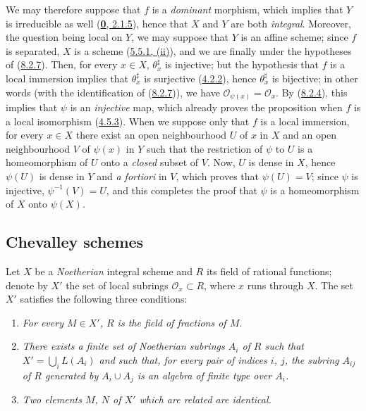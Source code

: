 We may therefore suppose that $f$ is a \emph{dominant} morphism, which
implies that $Y$ is irreducible as well
(\hyperref[0.2.1.5]{\textbf{0}, 2.1.5}), hence that $X$ and $Y$ are both
\emph{integral}. Moreover, the question being local on $Y$, we may suppose
that $Y$ is an affine scheme; since $f$ is separated, $X$ is a scheme
(\hyperref[I.5.5.1]{5.5.1, (ii)}), and we are finally under the
hypotheses of (\hyperref[I.8.2.7]{8.2.7}). Then, for every $x\in X$,
$\theta_x^\sharp$ is injective; but the hypothesis that $f$ is a local
immersion implies that $\theta_x^\sharp$ is surjective
(\hyperref[I.4.2.2]{4.2.2}), hence $\theta_x^\sharp$ is bijective;
in other words (with the identification of
(\hyperref[I.8.2.7]{8.2.7})), we have
$\mathscr{O}_{\psi(x)}=\mathscr{O}_x$. By
(\hyperref[I.8.2.4]{8.2.4}), this implies that $\psi$ is an
\emph{injective} map, which already proves the proposition when $f$ is a
local isomorphism (\hyperref[I.4.5.3]{4.5.3}). When we suppose only
that $f$ is a local immersion, for every $x\in X$ there exist an open
neighbourhood $U$ of $x$ in $X$ and an open neighbourhood $V$ of $\psi(x)$ in
$Y$ such that the restriction of $\psi$ to $U$ is a homeomorphism of $U$ onto
a \emph{closed} subset of $V$. Now, $U$ is dense in $X$, hence $\psi(U)$ is
dense in $Y$ and \emph{a fortiori} in $V$, which proves that
$\psi(U)=V$; since $\psi$ is injective, $\psi^{-1}(V)=U$, and this completes
the proof that $\psi$ is a homeomorphism of $X$ onto $\psi(X)$.

\subsection{Chevalley schemes}
\label{subsection:I.8.3}

\begin{env}[8.3.1]
\label{I.8.3.1}
Let $X$ be a \emph{Noetherian} integral scheme and $R$ its field of rational
functions; denote by $X'$ the set of local subrings
$\mathscr{O}_x\subset R$, where $x$ runs through $X$. The set $X'$ satisfies
the following three conditions:
\begin{enumerate}
  \item[(Sch. 1)] \emph{For every $M\in X'$, $R$ is the field of fractions
    of $M$.}
  \item[(Sch. 2)] \emph{There exists a finite set of Noetherian subrings
    $A_i$ of $R$ such that $X'=\bigcup_i L(A_i)$ and such that, for every pair
    of indices $i$, $j$, the subring $A_{ij}$ of $R$ generated by
    $A_i\cup A_j$ is an algebra of finite type over $A_i$.}
  \item[(Sch. 3)] \emph{Two elements $M$, $N$ of $X'$ which are related
    are identical.}
\end{enumerate}
\end{env}

